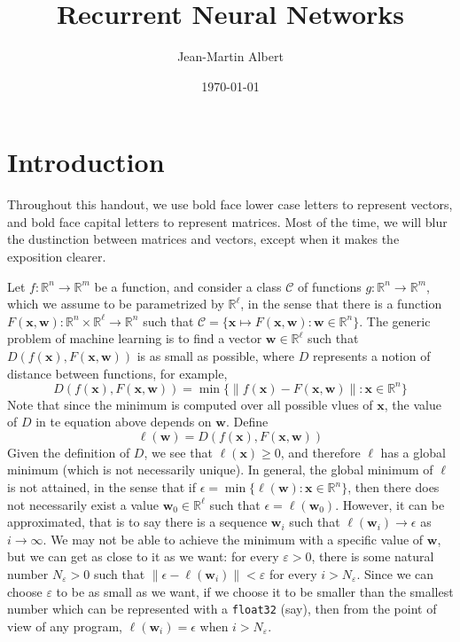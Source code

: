 \documentclass[10pt]{amsart}
\newcommand{\R}{\mathbb{R}}
\newcommand{\C}{\mathcal{C}}
\newcommand{\w}{\mathbf{w}}
\newcommand{\x}{\mathbf{x}}
\theoremstyle{definition}
\begin{document}
\title{Recurrent Neural Networks}
\author{Jean-Martin Albert}
\date{\today}
\maketitle


 \section{Introduction}

Throughout this handout, we use bold face lower case letters to represent vectors, and bold face capital letters to represent matrices.  Most of the time, we will blur the dustinction between matrices and vectors, except when it makes the exposition clearer.

 Let $f:\R^n\to \R^m$ be a function, and consider a class $\C$ of functions $g: \R^n\to \R^m$, which we assume to be parametrized by $\R^\ell$, in the sense that there is a function $F(\x,\w):\R^n\times \R^\ell\to\R^n$ such that $\C=\{\x\mapsto F(\x,\w):\w\in\R^n\}$.  The generic problem of machine learning is to find a vector $\w\in\R^{\ell}$ such that $D(f(\x), F(\x, \w))$ is as small as possible, where $D$ represents a notion of distance between functions, for example, $$D(f(\x), F(\x, \w)) = \min\{\|f(\x)-F(\x, \w)\|:\x\in\R^n\}$$ Note that since the minimum is computed over all possible vlues of $\x$, the value of $D$ in te equation above depends on $\w$.  Define $$\ell(\w)=D(f(\x), F(\x, \w))$$ Given the definition of $D$, we see that $\ell(\x)\geq 0$, and therefore $\ell$ has a global minimum (which is not necessarily unique). In general, the global minimum of $\ell$ is not attained, in the sense that if $\epsilon=\min\{\ell(\w):\x\in\R^n\}$, then there does not necessarily exist a value $\w_0\in\R^\ell$ such that $\epsilon=\ell(\w_0)$.  However, it can be approximated, that is to say there is a sequence $\w_i$ such that $\ell(\w_i)\to\epsilon$ as $i\to\infty$.  We may not be able to achieve the minimum with a specific value of $\w$, but we can get as close to it as we want: for every $\varepsilon>0$, there is some natural number $N_\varepsilon>0$ such that $\|\epsilon-\ell(\w_i)\|<\varepsilon$ for every $i>N_\varepsilon$. Since we can choose $\varepsilon$ to be as small as we want, if we choose it to be smaller than the smallest number which can be represented with a {\tt float32} (say), then from the point of view of any program, $\ell(\w_i)=\epsilon$ when $i>N_\varepsilon$.
\end{document}

